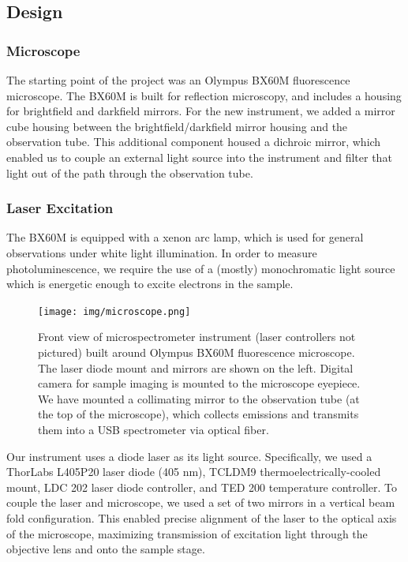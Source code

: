 \subsection{Design}

\subsubsection{Microscope}

The starting point of the project was an Olympus BX60M fluorescence microscope. The BX60M is built for reflection microscopy, and includes a housing for brightfield and darkfield mirrors. For the new instrument, we added a mirror cube housing between the brightfield/darkfield mirror housing and the observation tube. This additional component housed a dichroic mirror, which enabled us to couple an external light source into the instrument and filter that light out of the path through the observation tube.

\subsubsection{Laser Excitation}
The BX60M is equipped with a xenon arc lamp, which is used for general observations under white light illumination. In order to measure photoluminescence, we require the use of a (mostly) monochromatic light source which is energetic enough to excite electrons in the sample.

\begin{figure}[H]
    \centering
    \texttt{[image: img/microscope.png]}
    \caption[Front view of microspectrometer instrument.]{Front view of microspectrometer instrument (laser controllers not pictured) built around Olympus BX60M fluorescence microscope. The laser diode mount and mirrors are shown on the left. Digital camera for sample imaging is mounted to the microscope eyepiece. We have mounted a collimating mirror to the observation tube (at the top of the microscope), which collects emissions and transmits them into a USB spectrometer via optical fiber.}
    \label{img:microscope}
\end{figure}

Our instrument uses a diode laser as its light source. Specifically, we used a ThorLabs L405P20 laser diode (405 nm), TCLDM9 thermoelectrically-cooled mount, LDC 202 laser diode controller, and TED 200 temperature controller. To couple the laser and microscope, we used a set of two mirrors in a vertical beam fold configuration. This enabled precise alignment of the laser to the optical axis of the microscope, maximizing transmission of excitation light through the objective lens and onto the sample stage.

